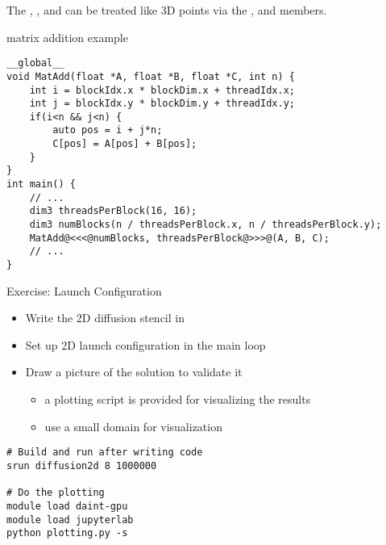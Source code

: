 \documentclass[aspectratio=43]{beamer}
\begin{document}
\begin{frame}[fragile]{}

    The , ,  and  can be treated like 3D points via the ,  and  members.
    \begin{code}{matrix addition example}
        \begin{lstlisting}[style=boxcudatiny]
__global__
void MatAdd(float *A, float *B, float *C, int n) {
    int i = blockIdx.x * blockDim.x + threadIdx.x;
    int j = blockIdx.y * blockDim.y + threadIdx.y;
    if(i<n && j<n) {
        auto pos = i + j*n;
        C[pos] = A[pos] + B[pos];
    }
}
int main() {
    // ...
    dim3 threadsPerBlock(16, 16);
    dim3 numBlocks(n / threadsPerBlock.x, n / threadsPerBlock.y);
    MatAdd@<<<@numBlocks, threadsPerBlock@>>>@(A, B, C);
    // ...
}
        \end{lstlisting}
   \end{code}

\end{frame}

\begin{frame}[fragile]{Exercise: Launch Configuration}
    \begin{itemize}
        \item Write the 2D diffusion stencil in 
        \item Set up 2D launch configuration in the main loop
        \item Draw a picture of the solution to validate it
        \begin{itemize}
            \item a plotting script is provided for visualizing the results
            \item use a small domain for visualization
        \end{itemize}
    \end{itemize}

    \begin{terminal}{}
        \begin{lstlisting}[style=terminal]
# Build and run after writing code
srun diffusion2d 8 1000000

# Do the plotting
module load daint-gpu
module load jupyterlab
python plotting.py -s
        \end{lstlisting}
    \end{terminal}
\end{frame}
\end{document}
